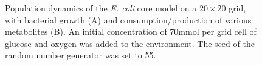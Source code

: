 \begin{figure}[h!]
  \centering
  \caption{Population dynamics of the \emph{E. coli} core model on a $20\times20$ grid, with bacterial growth (A) and consumption/production of various metabolites (B). An initial concentration of 70\;mmol per grid cell of glucose and oxygen was added to the environment. The seed of the random number generator was set to 55.}
\label{fig:ecoresg}
\end{figure}
